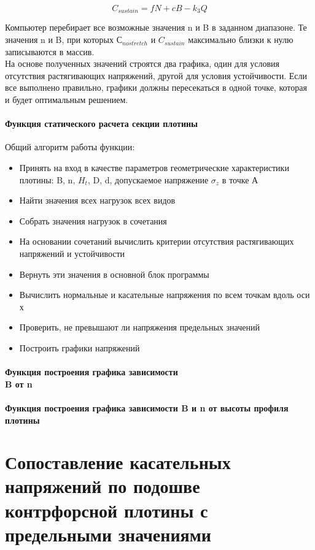 \documentclass[12pt,a4paper,oneside,draft,titlepage]{article}
\begin{document}
$$ C_{sustain} = f  N + c  B - k_3  Q $$


Компьютер перебирает все возможные значения n и B в заданном диапазоне.
Те значения n и B, при которых $С_{nostretch}$ и $C_{sustain}$ максимально близки к нулю записываются в массив.\\
На основе полученных значений строятся два графика, один для условия отсутствия растягивающих напряжений, другой для условия устойчивости.
Если все выполнено правильно, графики должны пересекаться в одной точке, которая и будет оптимальным решением.

\subsection{Функция статического расчета секции плотины}

Общий алгоритм работы функции:
\begin{itemize}
	\item Принять на вход в качестве параметров геометрические характеристики плотины: B, n, $H_t$, D, d, допускаемое напряжение $\sigma_z$ в точке А
	\item Найти значения всех нагрузок всех видов
	\item Собрать значения нагрузок в сочетания
	\item На основании сочетаний вычислить критерии отсутствия растягивающих напряжений и устойчивости
	\item Вернуть эти значения в основной блок программы
	\item Вычислить нормальные и касательные напряжения по всем точкам вдоль оси х
	\item Проверить, не превышают ли напряжения предельных значений
	\item Построить графики напряжений
\end{itemize}


\subsection{Функция построения графика зависимости\\ B от n}

\subsection{Функция построения графика зависимости B и n от высоты профиля плотины}

\part{Сопоставление касательных напряжений по подошве контрфорсной плотины с предельными значениями}
\end{document}
